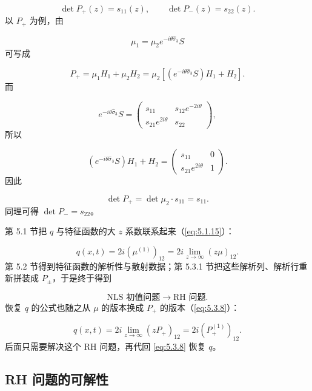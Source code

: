\documentclass[
    lang=cn,
    scheme=chinese,
    mode=simple,
    device=normal,
    color=blue,
    math=cm,
    thmcnt=section,
    12pt,
    nowatermark
]{elegantbook}
\begin{document}
\begin{callout}
    \[
        \det P_+(z)=s_{11}(z),
        \qquad
        \det P_-(z)=s_{22}(z).
    \]
    以 $P_+$ 为例，由

    \[
        \mu_1
        =
        \mu_2e^{-i\theta\widehat{\sigma}_3}S
    \]
    可写成

    \[
        P_+
        =
        \mu_1H_1+\mu_2H_2
        =
        \mu_2
        \left[
            \left(e^{-i\theta\widehat{\sigma}_3}S\right)H_1+H_2
            \right].
    \]
    而

    \[
        e^{-i\theta\widehat{\sigma}_3}S
        =
        \begin{pmatrix}
            s_{11}             & s_{12}e^{-2i\theta} \\
            s_{21}e^{2i\theta} & s_{22}
        \end{pmatrix},
    \]
    所以

    \[
        \left(e^{-i\theta\widehat{\sigma}_3}S\right)H_1+H_2
        =
        \begin{pmatrix}
            s_{11}             & 0 \\
            s_{21}e^{2i\theta} & 1
        \end{pmatrix}.
    \]
    因此

    \[
        \det P_+
        =
        \det\mu_2\cdot s_{11}
        =
        s_{11}.
    \]
    同理可得 $\det P_-=s_{22}$。
\end{callout}

\begin{callout}[到这里发生了什么？]
    第 5.1 节把 $q$ 与特征函数的大 $z$ 系数联系起来（\eqref{eq:5.1.15}）：

    \[
        q(x,t)=2i(\mu^{(1)})_{12}=2i\lim\limits_{z\to\infty}(z\mu)_{12}.
    \]
    第 5.2 节得到特征函数的解析性与散射数据；第 5.3.1 节把这些解析列、解析行重新拼装成 $P_\pm$，于是终于得到

    \[
        \boxed{\text{NLS 初值问题}\longrightarrow\text{RH 问题}.}
    \]
    恢复 $q$ 的公式也随之从 $\mu$ 的版本换成 $P_+$ 的版本（\eqref{eq:5.3.8}）：

    \[
        q(x,t)=2i\lim\limits_{z\to\infty}(zP_+)_{12}=2i(P_+^{(1)})_{12}.
    \]
    后面只需要解决这个 RH 问题，再代回 \eqref{eq:5.3.8} 恢复 $q$。
\end{callout}

\subsection{RH 问题的可解性}
\end{document}
